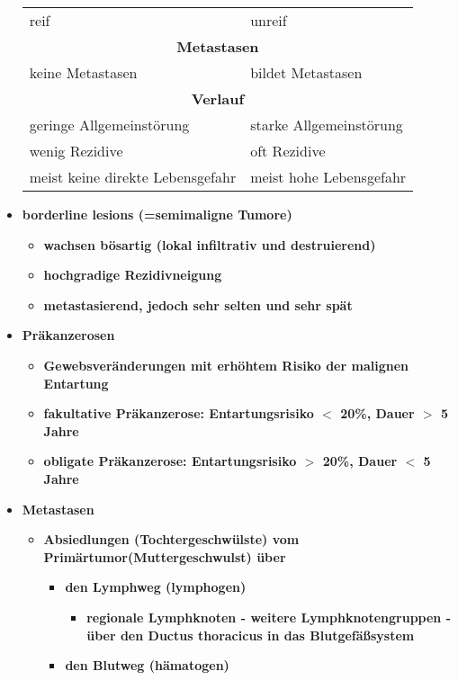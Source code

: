 \begin{itemize}
\begin{center}
\begin{tabular}{|ll|}
						reif & unreif \\
						\multicolumn{2}{|c|}{\textbf{Metastasen}} \\
						keine Metastasen & bildet Metastasen \\
						\multicolumn{2}{|c|}{\textbf{Verlauf}} \\
						geringe Allgemeinstörung & starke Allgemeinstörung \\
						wenig Rezidive & oft Rezidive \\
						meist keine direkte Lebensgefahr & meist hohe Lebensgefahr\\
						\hline
					\end{tabular}
				\end{center}
			\item \textbf{borderline lesions (=semimaligne Tumore)}
				\begin{itemize}
					\item \textbf{wachsen bösartig (lokal infiltrativ und destruierend)}
					\item \textbf{hochgradige Rezidivneigung}
					\item \textbf{metastasierend, jedoch sehr selten und sehr spät}
				\end{itemize}
			\item \textbf{Präkanzerosen}
				\begin{itemize}
					\item \textbf{Gewebsveränderungen mit erhöhtem Risiko der malignen Entartung}
					\item \textbf{fakultative Präkanzerose: Entartungsrisiko $<$ 20\%, Dauer $>$ 5 Jahre}
					\item \textbf{obligate Präkanzerose: Entartungsrisiko $>$ 20\%, Dauer $<$ 5 Jahre}
				\end{itemize}
			\item \textbf{Metastasen}
				\begin{itemize}
					\item \textbf{Absiedlungen (Tochtergeschwülste) vom Primärtumor(Muttergeschwulst) über}
						\begin{itemize}
							\item \textbf{den Lymphweg (lymphogen)}
								\begin{itemize}
									\item \textbf{regionale Lymphknoten - weitere Lymphknotengruppen - über den Ductus thoracicus in das Blutgefäßsystem}
								\end{itemize}
							\item \textbf{den Blutweg (hämatogen)}

\end{itemize}
\end{itemize}
\end{itemize}
